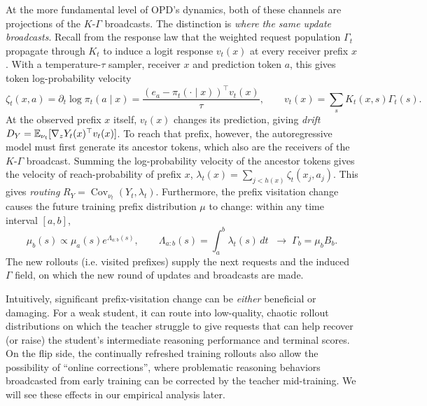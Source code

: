 At the more fundamental level of OPD's dynamics, both of these channels are projections of the $K$-$\Gamma$ broadcasts. The distinction is \emph{where the same update broadcasts}. Recall from the response law that the weighted request population $\Gamma_t$ propagate through $K_t$ to induce a logit response $v_t(x)$ at every receiver prefix $x$. With a temperature-$\tau$ sampler, receiver $x$ and prediction token $a$, this gives token log-probability velocity
\begin{equation}
 \zeta_t(x,a)=\partial_t\log\pi_t(a\mid x)
 =\frac{(e_a-\pi_t(\cdot\mid x))^\top v_t(x)}{\tau},
 \qquad v_t(x)=\sum_sK_t(x,s)\Gamma_t(s).
 \label{eq:rd-velocity}
\end{equation}
At the observed prefix $x$ itself, $v_t(x)$ changes its prediction, giving \emph{drift} $D_Y=\mathbb{E}_{\nu_t}[\nabla_zY_t(x)^\top v_t(x)]$. To reach that prefix, however, the autoregressive model must first generate its ancestor tokens, which also are the receivers of the $K$-$\Gamma$ broadcast. Summing the log-probability velocity of the ancestor tokens gives the velocity of reach-probability of prefix $x$, $\lambda_t(x)=\sum_{j<h(x)}\zeta_t(x_j,a_j)$. This gives \emph{routing} $R_Y=\operatorname{Cov}_{\nu_t}(Y_t,\lambda_t)$. 
Furthermore, the prefix visitation change causes the future training prefix distribution $\mu$ to change: within any time interval $[a,b]$,
\begin{equation}
 \mu_b(s)\propto\mu_a(s)e^{\Lambda_{a:b}(s)},\qquad
 \Lambda_{a:b}(s)=\int_a^b\lambda_t(s)\,dt\;\;\rightarrow \;\Gamma_b=\mu_bB_b.
 \label{eq:broadcast-source-renewal}
\end{equation}
The new rollouts (i.e. visited prefixes) supply the next requests and the induced $\Gamma$ field, on which the new round of updates and broadcasts are made. 

Intuitively, significant prefix-visitation change can be \emph{either} beneficial or damaging. For a weak student, it can route into low-quality, chaotic rollout distributions on which the teacher struggle to give requests that can help recover (or raise) the student's intermediate reasoning performance and terminal scores. On the flip side, the continually refreshed training rollouts also allow the possibility of ``online corrections'', where problematic reasoning behaviors broadcasted from early training can be corrected by the teacher mid-training. We will see these effects in our empirical analysis later.

